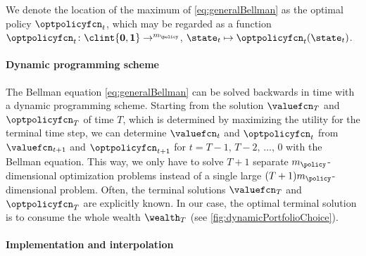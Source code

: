 We denote the location of the maximum of \eqref{eq:generalBellman}
as the optimal policy $\optpolicyfcn_t$,
which may be regarded as a function
$\optpolicyfcn_t\colon \clint{\*0, \*1} \to \real^{m_{\policy}}$,
$\state_t \mapsto \optpolicyfcn_t(\state_t)$.

\paragraph{Dynamic programming scheme}

The Bellman equation \eqref{eq:generalBellman} can be solved
backwards in time with a dynamic programming scheme.
Starting from the solution $\valuefcn_T$ and $\optpolicyfcn_T$
of time $T$, which is determined by maximizing the utility
for the terminal time step,
we can determine $\valuefcn_t$ and $\optpolicyfcn_t$
from $\valuefcn_{t+1}$ and $\optpolicyfcn_{t+1}$
for $t = T - 1,\, T - 2,\, \dotsc,\, 0$ with the Bellman equation.
This way, we only have to solve $T+1$ separate $m_{\policy}$-dimensional
optimization problems instead of a single large
$(T+1) m_{\policy}$-dimensional problem.
Often, the terminal solutions $\valuefcn_T$ and $\optpolicyfcn_T$
are explicitly known.
In our case, the optimal terminal solution is
to consume the whole wealth $\wealth_T$
(see \cref{fig:dynamicPortfolioChoice}).

\paragraph{Implementation and interpolation}

